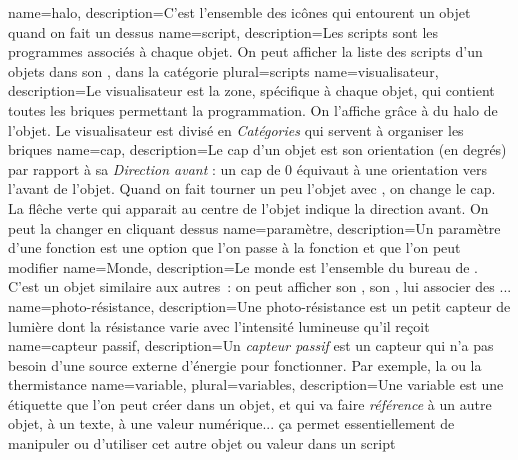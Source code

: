 

		{name={halo}, 
		description={C'est l'ensemble des icônes qui entourent un objet quand on fait un \rc dessus}}
		{name={script}, 
		description={Les scripts sont les programmes associés à chaque objet. On peut afficher la liste des scripts d'un objets dans son , dans la catégorie }
		plural={scripts}}
		{name={visualisateur}, 
		description={Le visualisateur est la zone, spécifique à chaque objet, qui contient toutes les briques permettant la programmation. On l'affiche grâce à  du halo de l'objet. Le visualisateur est divisé en \emph{Catégories} qui servent à organiser les briques}}
		{name={cap}, 
		description={Le cap d'un objet est son orientation (en degrés) par rapport à sa \emph{Direction avant} : un cap de 0 équivaut à une orientation vers \og l'avant \fg de l'objet. Quand on fait tourner un peu l'objet avec , on change le cap. La flêche verte qui apparait au centre de l'objet indique la direction avant. On peut la changer en cliquant dessus }}
		{name={paramètre}, 
		description={Un paramètre d'une fonction est une option que l'on passe à la fonction et que l'on peut modifier}}
		{name={Monde}, 
		description={Le  monde  est l'ensemble du bureau de \appName. C'est un objet similaire aux autres~: on peut afficher son , son , lui associer des ...}}
		{name={photo-résistance}, 
		description={Une photo-résistance est un petit capteur de lumière dont la résistance varie avec l'intensité lumineuse qu'il reçoit}}
		{name={capteur passif},
		description={Un \emph{capteur passif} est un capteur qui n'a pas besoin d'une source externe d'énergie pour fonctionner. Par exemple, la  ou la thermistance}}
		{name={variable}, 
		plural={variables}, 
		description={Une variable est une étiquette que l'on peut créer dans un objet, et qui va faire \textit{référence} à un autre objet, à un texte, à une valeur numérique... ça permet essentiellement de manipuler ou d'utiliser cet autre objet ou valeur dans un script}}
